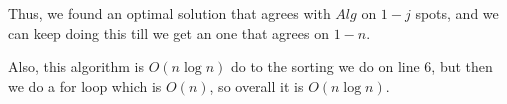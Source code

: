 \documentclass[12pt, letterpaper]{article}
\theoremstyle{definition}
\begin{document}
\begin{enumerate}[(a)]
        Thus, we found an optimal solution that agrees with $Alg$ on $1-j$ spots, and we can keep doing this till we get an one that agrees on $1-n$.

        Also, this algorithm is $O(n\log n)$ do to the sorting we do on line $6$, but then we do a for loop which is $O(n)$, so overall it is $O(n \log n)$.
\end{enumerate}
\end{document}
